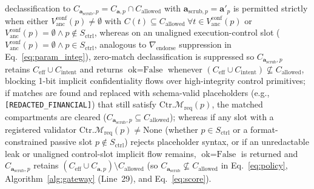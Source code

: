 \documentclass[conference,10pt]{IEEEtran}
\begin{document}
declassification to $C_{\mathbf{a}_{\text{scrub}}, p} = C_{\mathbf{a}, p} \cap C_{\text{allowed}}$ with $\mathbf{a}_{\text{scrub}, p} = \mathbf{a}'_p$ is permitted strictly when either $V_{\text{anc}}^{\text{conf}}(p) \ne \emptyset$ with $C(t) \subseteq C_{\text{allowed}}\ \forall t \in V_{\text{anc}}^{\text{conf}}(p)$ or $V_{\text{anc}}^{\text{conf}}(p) = \emptyset \land p \notin S_{\text{ctrl}}$, whereas on an unaligned execution-control slot ($V_{\text{anc}}^{\text{conf}}(p) = \emptyset \land p \in S_{\text{ctrl}}$, analogous to $\nabla_{\text{endorse}}$ suppression in Eq.~\ref{eq:param_integ}), zero-match declassification is suppressed so $C_{\mathbf{a}_{\text{scrub}}, p}$ retains $C_{\text{eff}} \cup C_{\text{intent}}$ and returns $\text{ok} = \text{False}$ whenever $(C_{\text{eff}} \cup C_{\text{intent}}) \not\subseteq C_{\text{allowed}}$, blocking 1-bit implicit confidentiality flows over high-integrity control primitives; if matches are found and replaced with schema-valid placeholders (e.g., \texttt{[REDACTED\_FINANCIAL]}) that still satisfy $\text{Ctr}.\mathcal{M}_{\text{req}}(p)$, the matched compartments are cleared ($C_{\mathbf{a}_{\text{scrub}}, p} \subseteq C_{\text{allowed}}$); whereas if any slot with a registered validator $\text{Ctr}.\mathcal{M}_{\text{req}}(p) \neq \text{None}$ (whether $p \in S_{\text{ctrl}}$ or a format-constrained passive slot $p \notin S_{\text{ctrl}}$) rejects placeholder syntax, or if an unredactable leak or unaligned control-slot implicit flow remains, $\text{ok} = \text{False}$ is returned and $C_{\mathbf{a}_{\text{scrub}}, p}$ retains $(C_{\text{eff}} \cup C_{\mathbf{a}, p}) \setminus C_{\text{allowed}}$ (so $C_{\mathbf{a}_{\text{scrub}}} \not\subseteq C_{\text{allowed}}$ in Eq.~\ref{eq:policy}, Algorithm~\ref{alg:gateway} (Line~29), and Eq.~\ref{eq:score}).
\end{document}
